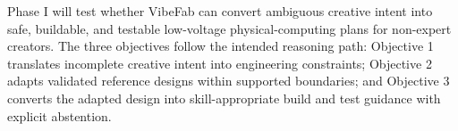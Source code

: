 
Phase I will test whether VibeFab can convert ambiguous creative intent into safe, buildable, and testable low-voltage physical-computing plans for non-expert creators. The three objectives follow the intended reasoning path: Objective 1 translates incomplete creative intent into engineering constraints; Objective 2 adapts validated reference designs within supported boundaries; and Objective 3 converts the adapted design into skill-appropriate build and test guidance with explicit abstention.

